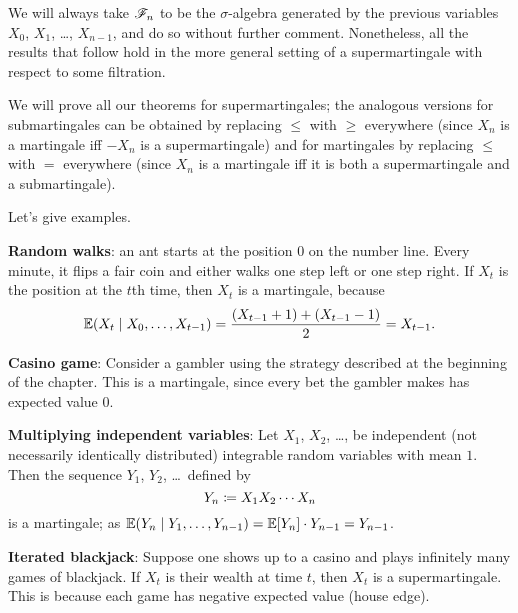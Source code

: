 
\begin{abuse}
	We will always take $\mathscr F_n$ to be the $\sigma$-algebra
	generated by the previous variables $X_0$, $X_1$, \dots, $X_{n-1}$,
	and do so without further comment.
	Nonetheless, all the results that follow hold in the more general setting
	of a supermartingale with respect to some filtration.
\end{abuse}

We will prove all our theorems for supermartingales;
the analogous versions for submartingales can be obtained
by replacing $\le$ with $\ge$ everywhere
(since $X_n$ is a martingale iff $-X_n$ is a supermartingale)
and for martingales by replacing $\le$ with $=$ everywhere
(since $X_n$ is a martingale iff it is both a supermartingale
and a submartingale).

Let's give examples.
\begin{example}
	[Supermartingales]
	\label{ex:supermartingales}
	\listhack
	\begin{enumerate}[(a)]
		\ii \textbf{Random walks}:
		an ant starts at the position $0$ on the number line.
		Every minute, it flips a fair coin and either
		walks one step left or one step right.
		If $X_t$ is the position at the $t$th time,
		then $X_t$ is a martingale, because
		\[ \mathbb E(X_t \mid X_0, \dots, X_{t-1})
			= \frac{(X_{t-1}+1) + (X_{t-1}-1)}{2} = X_{t-1}. \]

		\ii \textbf{Casino game}:
		Consider a gambler using the strategy described
		at the beginning of the chapter.
		This is a martingale, since every bet the gambler makes
		has expected value $0$.

		\ii \textbf{Multiplying independent variables}:
		Let $X_1$, $X_2$, \dots, be independent (not necessarily
		identically distributed) integrable random variables with mean $1$.
		Then the sequence $Y_1$, $Y_2$, \dots\ defined by
		\[ Y_n \coloneqq X_1 X_2 \cdots X_n \]
		is a martingale; as
		$\mathbb E(Y_n \mid Y_1, \dots, Y_{n-1}) = \mathbb E[Y_n] \cdot Y_{n-1} = Y_{n-1}$.

		\ii \textbf{Iterated blackjack}:
		Suppose one shows up to a casino and plays
		infinitely many games of blackjack.
		If $X_t$ is their wealth at time $t$, then $X_t$ is a supermartingale.
		This is because each game has negative expected value (house edge).
	\end{enumerate}
\end{example}

